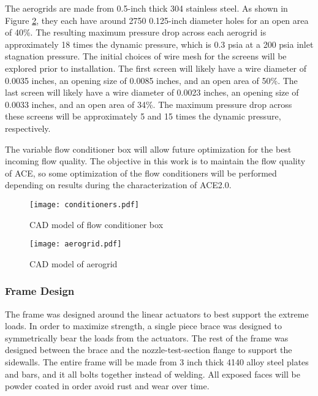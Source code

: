 The aerogrids are made from 0.5-inch thick 304 stainless steel. As shown in Figure \ref{fig:aerogrid}, they each have around 2750 0.125-inch diameter holes for an open area of 40\%. The resulting maximum pressure drop across each aerogrid is approximately 18 times the dynamic pressure, which is 0.3 psia at a 200 psia inlet stagnation pressure. The initial choices of wire mesh for the screens will be explored prior to installation. The first screen will likely have a wire diameter of 0.0035 inches, an opening size of 0.0085 inches, and an open area of 50\%. The last screen will likely have a wire diameter of 0.0023 inches, an opening size of 0.0033 inches, and an open area of 34\%. The maximum pressure drop across these screens will be approximately 5 and 15 times the dynamic pressure, respectively. 

The variable flow conditioner box will allow future optimization for the best incoming flow quality. The objective in this work is to maintain the flow quality of ACE, so some optimization of the flow conditioners will be performed depending on results during the characterization of ACE2.0.

\begin{figure}[ht!]
    \centering
    \texttt{[image: conditioners.pdf]}
    \caption{CAD model of flow conditioner box}
    \label{fig:conditioners}
\end{figure}

\begin{figure}[ht!]
    \centering
    \texttt{[image: aerogrid.pdf]}
    \caption{CAD model of aerogrid}
    \label{fig:aerogrid}
\end{figure}

\subsubsection*{Frame Design}

The frame was designed around the linear actuators to best support the extreme loads. In order to maximize strength, a single piece brace was designed to symmetrically bear the loads from the actuators. The rest of the frame was designed between the brace and the nozzle-test-section flange to support the sidewalls. The entire frame will be made from 3 inch thick 4140 alloy steel plates and bars, and it all bolts together instead of welding. All exposed faces will be powder coated in order avoid rust and wear over time. 

